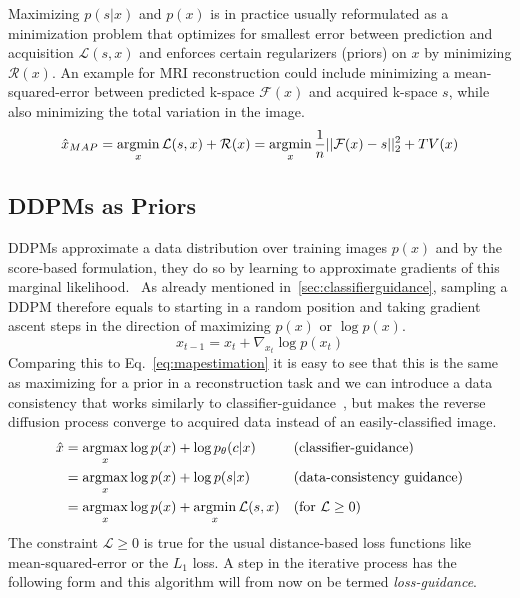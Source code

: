 Maximizing $p(s|x)$ and $p(x)$ is in practice usually reformulated as a minimization problem that optimizes for smallest error between prediction and acquisition $\mathcal{L}(s, x)$ and enforces certain regularizers (priors) on $x$ by minimizing $\mathcal{R}(x)$. An example for MRI reconstruction could include minimizing a mean-squared-error between predicted k-space $\mathcal{F}(x)$ and acquired k-space $s$, while also minimizing the total variation in the image.~\autocite{RUDIN1992259}
\begin{equation}
    \hat{x}_{MAP} = \operatorname*{argmin}_x \mathcal{L}(s, x) + \mathcal{R}(x) = \operatorname*{argmin}_x \frac{1}{n}||\mathcal{F}(x) - s||_2^2 + TV(x)
\end{equation}

\subsection{DDPMs as Priors}
\label{sec:lossguidance}
DDPMs approximate a data distribution over training images $p(x)$ and by the score-based formulation, they do so by learning to approximate gradients of this marginal likelihood.~\autocite{song2020generative} As already mentioned in~\ref{sec:classifierguidance}, sampling a DDPM therefore equals to starting in a random position and taking gradient ascent steps in the direction of maximizing $p(x)$ or $\log p(x)$.
\begin{equation}
    \label{eq:ddpmiteration}
    x_{t-1} = x_{t} + \nabla_{x_t} \log p(x_t)
\end{equation}
Comparing this to Eq.~\ref{eq:mapestimation} it is easy to see that this is the same as maximizing for a prior in a reconstruction task and we can introduce a data consistency that works similarly to classifier-guidance~\autocite{dhariwal2021diffusion}, but makes the reverse diffusion process converge to acquired data instead of an easily-classified image.
\begin{align}
    \hat{x} & = \operatorname*{argmax}_x \log p(x) + \log p_{\theta}(c|x)        &  & \text{(classifier-guidance)}       \\
            & = \operatorname*{argmax}_x \log p(x) + \log p(s|x)                 &  & \text{(data-consistency guidance)} \\
            & = \operatorname*{argmax}_x \log p(x) + \operatorname*{argmin}_x \mathcal{L}(s, x) &  & \text{(for $\mathcal{L} \geq 0$)}  \\
\end{align}
The constraint $\mathcal{L} \geq 0$ is true for the usual distance-based loss functions like mean-squared-error or the $L_1$ loss. A step in the iterative process has the following form and this algorithm will from now on be termed \textit{loss-guidance}.
